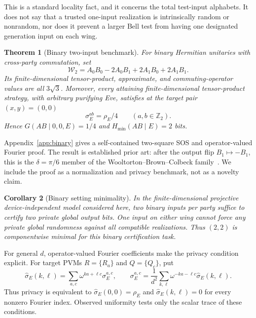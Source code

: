 \documentclass[11pt]{article}
\newtheorem{theorem}{Theorem}[section]
\newtheorem{corollary}[theorem]{Corollary}
\theoremstyle{definition}
\theoremstyle{remark}
\newcommand{\bbZ}{\mathbb Z}
\begin{document}
This is a standard locality fact, and it concerns the total test-input
alphabets.  It does not say that a trusted one-input realization is
intrinsically random or nonrandom, nor does it prevent a larger Bell test
from having one designated generation input on each wing.

\begin{theorem}[Binary two-input benchmark]
\label{thm:binary-benchmark}
For binary Hermitian unitaries with cross-party commutation, set
\[
 \mathcal W_2=A_0B_0-2A_0B_1+2A_1B_0+2A_1B_1.
\]
Its finite-dimensional tensor-product, approximate, and commuting-operator
values are all \(3\sqrt3\).  Moreover, every attaining finite-dimensional
tensor-product strategy, with arbitrary purifying Eve, satisfies at the
target pair \((x,y)=(0,0)\)
\[
 \sigma_E^{ab}=\rho_E/4\qquad(a,b\in\bbZ_2).
\]
Hence \(G(AB\mid0,0,E)=1/4\) and
\(H_{\min}(AB\mid E)=2\) bits.
\end{theorem}

Appendix~\ref{app:binary} gives a self-contained two-square SOS and
operator-valued Fourier proof.  The result is established prior art: after
the output flip \(B_1\mapsto-B_1\), this is the \(\delta=\pi/6\) member of
the Wooltorton--Brown--Colbeck family~\cite{WooltortonEtAl2022}.  We include
the proof as a normalization and privacy benchmark, not as a novelty claim.

\begin{corollary}[Binary setting minimality]
\label{cor:binary-minimality}
In the finite-dimensional projective device-independent model considered
here, two binary inputs per party suffice to certify two private global
output bits.  One input on either wing cannot force any private global
randomness against all compatible realizations.  Thus \((2,2)\) is
componentwise minimal for this binary certification task.
\end{corollary}

For general \(d\), operator-valued Fourier coefficients make the privacy
condition explicit.  For target PVMs \(R=\{R_a\}\) and \(Q=\{Q_c\}\), put
\[
 \widehat\sigma_E(k,\ell)
 =\sum_{a,c}\omega^{ka+\ell c}\sigma_E^{a,c},
 \qquad
 \sigma_E^{a,c}=\frac1{d^2}\sum_{k,\ell}
 \omega^{-ka-\ell c}\widehat\sigma_E(k,\ell).
\]
Thus privacy is equivalent to
\(\widehat\sigma_E(0,0)=\rho_E\) and
\(\widehat\sigma_E(k,\ell)=0\) for every nonzero Fourier index.  Observed
uniformity tests only the scalar trace of these conditions.
\end{document}
